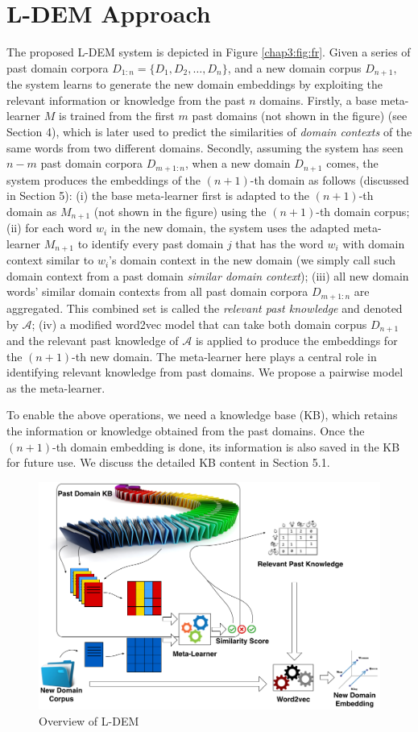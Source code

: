 \section{L-DEM Approach}
\label{chap3:sec:ldem}
The proposed L-DEM system is depicted in Figure \ref{chap3:fig:fr}.
Given a series of past domain corpora $D_{1:n}=\{D_1, D_2, \dots, D_n\}$, and a new domain corpus $D_{n+1}$, the system learns to generate the new domain embeddings by exploiting the relevant information or knowledge from the past $n$ domains.
Firstly, a base meta-learner $M$ is trained from the first $m$ past domains (not shown in the figure) (see Section 4), which is later used to predict the similarities of \emph{domain contexts} of the same words from two different domains.
Secondly, assuming the system has seen $n-m$ past domain corpora $D_{m+1:n}$, when a new domain $D_{n+1}$ comes, the system produces the embeddings of the $(n+1)$-th domain as follows (discussed in Section 5):
(i) the base meta-learner first is adapted to the $(n+1)$-th domain as $M_{n+1}$ (not shown in the figure) using the $(n+1)$-th domain corpus;
(ii) for each word $w_{i}$ in the new domain, the system uses the adapted meta-learner $M_{n+1}$ to identify every past domain $j$ that has the word $w_{i}$ with domain context similar to $w_{i}$'s domain context in the new domain (we simply call such domain context from a past domain \emph{similar domain context});
(iii) all new domain words' similar domain contexts from all past domain corpora $D_{m+1:n}$ are aggregated. This combined set is called the \textit{relevant past knowledge} and denoted by $\mathcal{A}$;
(iv) a modified word2vec model that can take both domain corpus $D_{n+1}$ and the relevant past knowledge of $\mathcal{A}$ is applied to produce the embeddings for the $(n+1)$-th new domain.
The meta-learner here plays a central role in identifying relevant knowledge from past domains.
We propose a pairwise model as the meta-learner. 

To enable the above operations, we need a knowledge base (KB), which retains the information or knowledge obtained from the past domains. Once the $(n+1)$-th domain embedding is done, its information is also saved in the KB for future use. We discuss the detailed KB content in Section 5.1.
\begin{figure}[t]
    \label{fig:ll}
    \centering    
    \includegraphics[width=4.5in]{fig/ijcai18_ll.png}
        \caption{Overview of L-DEM}
        \label{fig:fr}
    \end{figure}

